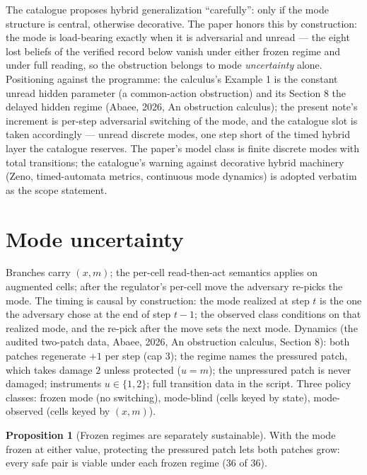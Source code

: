 \documentclass[10pt,twocolumn]{article}
\theoremstyle{definition}
\newtheorem{proposition}{Proposition}
\begin{document}
The catalogue proposes hybrid generalization ``carefully'': only if the
mode structure is central, otherwise decorative. The paper honors this by
construction: the mode is load-bearing exactly when it is adversarial and
unread --- the eight lost beliefs of the verified record below vanish
under either frozen regime and under full reading, so the obstruction
belongs to mode \emph{uncertainty} alone. Positioning against the
programme: the calculus's Example 1 is the constant unread hidden
parameter (a common-action obstruction) and its Section 8 the delayed
hidden regime (Abaee, 2026, An obstruction calculus); the present note's increment is per-step
adversarial switching of the mode, and the catalogue slot is taken
accordingly --- unread discrete modes, one step short of the timed hybrid
layer the catalogue reserves. The paper's model class is finite discrete modes
with total transitions; the catalogue's warning against decorative hybrid
machinery (Zeno, timed-automata metrics, continuous mode dynamics) is
adopted verbatim as the scope statement.

\section{Mode uncertainty}

Branches carry $(x,m)$; the per-cell read-then-act semantics applies on
augmented cells; after the regulator's per-cell move the adversary
re-picks the mode. The timing is causal by construction: the mode realized
at step $t$ is the one the adversary chose at the end of step $t-1$; the
observed class conditions on that realized mode, and the re-pick after the
move sets the next mode. Dynamics (the audited two-patch data, Abaee, 2026, An obstruction calculus,
Section 8): both patches regenerate $+1$ per step (cap $3$); the regime
names the pressured patch, which takes damage $2$ unless protected
($u=m$); the unpressured patch is never damaged; instruments
$u\in\{1,2\}$; full transition data in the script. Three policy classes:
frozen mode (no switching), mode-blind (cells keyed by state),
mode-observed (cells keyed by $(x,m)$).

\begin{proposition}[Frozen regimes are separately sustainable]
With the mode frozen at either value, protecting the pressured patch lets
both patches grow: every safe pair is viable under each frozen regime
($36$ of $36$).
\end{proposition}
\end{document}

